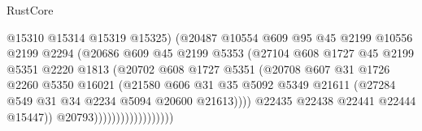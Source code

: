 \begin{lexlean}{RustCore}
\begin{coremodule}
                                        @15310
                                        @15314
                                        @15319
                                        @15325)
                                      (@20487
                                        @10554
                                        @609
                                        @95
                                        @45
                                        @2199
                                        @10556
                                        @2199
                                        @2294
                                        (@20686
                                          @609
                                          @45
                                          @2199
                                          @5353
                                          (@27104
                                            @608
                                            @1727
                                            @45
                                            @2199
                                            @5351
                                            @2220
                                            @1813
                                            (@20702
                                              @608
                                              @1727
                                              @5351
                                              (@20708
                                                @607
                                                @31
                                                @1726
                                                @2260
                                                @5350
                                                @16021
                                                (@21580
                                                  @606
                                                  @31
                                                  @35
                                                  @5092
                                                  @5349
                                                  @21611
                                                  (@27284 @549 @31 @34 @2234 @5094 @20600 @21613))))
                                            @22435
                                            @22438
                                            @22441
                                            @22444
                                            @15447))
                                        @20793))))))))))))))))))

\end{coremodule}
\end{lexlean}
